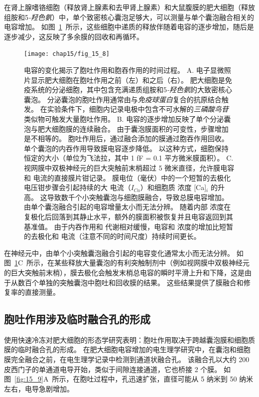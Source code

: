 在肾上腺嗜铬细胞（释放肾上腺素和去甲肾上腺素）和大鼠腹膜的肥大细胞（释放组胺和5\textit{-羟色氨}）中，单个致密核心囊泡足够大，可以测量与单个囊泡融合相关的电容增加。
如图~\ref{fig:15_8}~所示，这些细胞中递质的释放伴随着电容的逐步增加，随后是逐步减少，这反映了多余膜的回收和再循环。


\begin{figure}[htbp]
	\centering
	\texttt{[image: chap15/fig\_15\_8]}
	\caption{电容的变化揭示了胞吐作用和胞吞作用的时间过程。
		A. 电子显微照片显示肥大细胞在胞吐作用之前（左）和之后（右）。
		肥大细胞是免疫系统的分泌细胞，其中包含充满递质组胺和5\textit{-羟色氨}的大致密核心囊泡。
		分泌囊泡的胞吐作用通常由与\textit{免疫球蛋白}复合的抗原结合触发。
		在实验条件下，细胞内记录电极中包含不可水解的\textit{三磷酸鸟苷}类似物可触发大量胞吐作用。
		B. 电容的逐步增加反映了单个分泌囊泡与肥大细胞膜的连续融合。
		由于囊泡膜面积的可变性，步骤增加是不相等的。
		胞吐作用后，通过融合添加的膜通过胞吞作用回收。
		单个囊泡的内吞作用导致膜电容逐步降低。
		以这种方式，细胞保持恒定的大小（单位为飞法拉，其中 1 fF = 0.1 平方微米膜面积）\cite{fernandez1984capacitance}。
		C. 视网膜中双极神经元的巨大突触前末梢超过 5 微米直径，允许膜电容和  电流的直接膜片钳记录。
		膜电位（毫伏）中的一个短暂的去极化电压钳步骤会引起持续的大  电流（$I_{Ca}$）和细胞质  浓度 [Ca]$_i$ 的升高。
		这导致数千个小突触囊泡与细胞膜融合，导致总膜电容增加。
		由单个囊泡融合引起的电容增量太小而无法分辨。
		随着内部  浓度在复极化后回落到其静止水平，额外的膜面积被恢复并且电容返回到其基准值。
		由于内吞作用和  代谢相对缓慢，电容和  浓度的增加比短暂的去极化和  电流（注意不同的时间尺度）持续时间更长\cite{zenisek2004visualizing}。}
	\label{fig:15_8}
\end{figure}


在神经元中，由单个小突触囊泡融合引起的电容变化通常太小而无法分辨。
如图~\ref{fig:15_8}C~所示，在某些释放大量囊泡的有利突触制剂中（例如视网膜中双极神经元的巨大突触前末梢），膜去极化会触发末梢总电容的瞬时平滑上升和下降，这是由于从数百个单独的突触囊泡中胞吐和回收膜的结果。
这些结果提供了膜融合和修复率的直接测量。



\subsection{胞吐作用涉及临时融合孔的形成}

使用快速冷冻对肥大细胞的形态学研究表明：胞吐作用取决于跨越囊泡膜和细胞质膜的临时融合孔的形成。
在肥大细胞电容增加的电生理学研究中，在囊泡和细胞膜完全融合之前，在电生理学记录中检测到通道状融合孔。 
该融合孔以大约 200 皮西门子的单通道电导开始，类似于间隙连接通道，它也桥接 2 个膜。
如图~\ref{fig:15_9}A~所示，在胞吐过程中，孔迅速扩张，直径可能从 5 纳米到 50 纳米左右，电导急剧增加。


